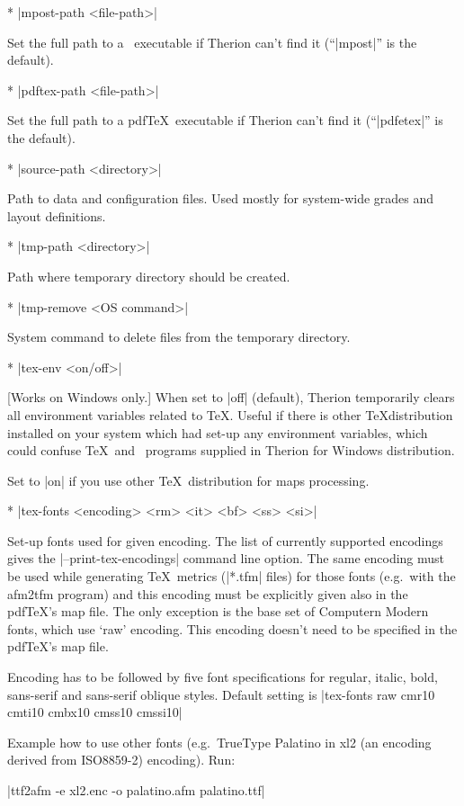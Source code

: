 * |mpost-path <file-path>|

  Set the full path to a \MP\ executable if Therion can't find it 
  (``|mpost|'' is the default).

* |pdftex-path <file-path>|

  Set the full path to a pdf\TeX\ executable if Therion can't find it 
  (``|pdfetex|'' is the default).

* |source-path <directory>| 

  Path to data and configuration files. Used mostly for system-wide grades and 
  layout definitions.

* |tmp-path <directory>| 

  Path where temporary directory should be created.
  
* |tmp-remove <OS command>| 

  System command to delete files from the temporary directory.

* |tex-env <on/off>| 

  [Works on Windows only.]
  When set to |off| (default), Therion temporarily clears all environment 
  variables related to \TeX. Useful if there is other \TeX distribution
  installed on your system which had set-up any environment variables,
  which could confuse \TeX\ and \MP\ programs supplied in Therion for Windows
  distribution. 
  
  Set to |on| if you use other \TeX\ distribution for maps processing.

* |tex-fonts <encoding> <rm> <it> <bf> <ss> <si>|
        
  Set-up fonts used for given encoding. The list of currently supported 
  encodings gives the |--print-tex-encodings| command line option.   
  The same encoding must be used while generating \TeX\ metrics (|*.tfm| files) 
  for those fonts (e.g.~with the afm2tfm program) and this encoding must be
  explicitly given also in the pdf\TeX's map file. The only exception is the 
  base set of Computern Modern fonts, which use `raw' encoding. This encoding
  doesn't need to be specified in the pdf\TeX's map file.
  
  Encoding has to be followed by five font specifications for regular, italic,
  bold, sans-serif and sans-serif oblique styles.
  Default setting is |tex-fonts raw cmr10 cmti10 cmbx10 cmss10 cmssi10|
  
  Example how to use other fonts (e.g.~TrueType Palatino in xl2 (an encoding 
  derived from ISO8859-2) encoding). Run:
  
  |ttf2afm -e xl2.enc -o palatino.afm palatino.ttf|
  
